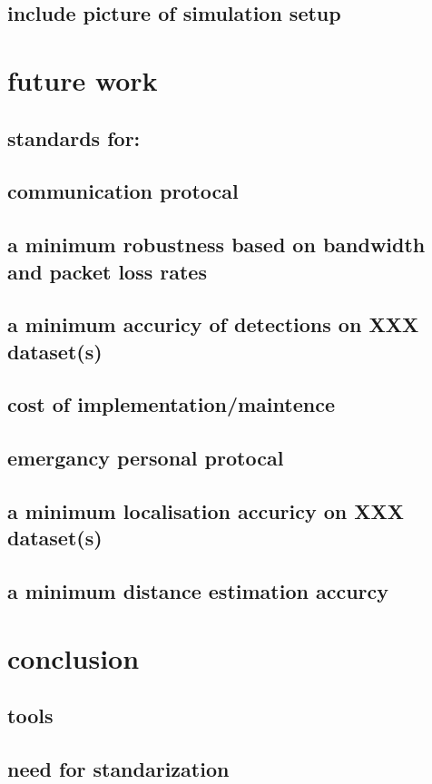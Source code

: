 \documentclass[conference]{IEEEtran}
\begin{document}
\subsection{include picture of simulation setup}

\section{future work}
\subsection{standards for:}
\subsection{communication protocal}
\subsection{a minimum robustness based on bandwidth and packet loss rates}
\subsection{a minimum accuricy of detections on XXX dataset(s)}
\subsection{cost of implementation/maintence}
\subsection{emergancy personal protocal}
\subsection{a minimum localisation accuricy on XXX dataset(s)}
\subsection{a minimum distance estimation accurcy}

\section{conclusion}
\subsection{tools}
\subsection{need for standarization}
\end{document}
